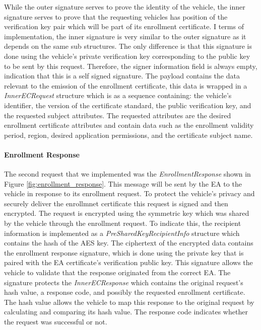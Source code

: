 While the outer signature serves to prove the identity of the vehicle, the inner signature serves to prove that the requesting vehicles has position of the verification key pair which will be part of its enrollment certificate. I terms of implementation, the inner signature is very similar to the outer signature as it depends on the same sub structures. The only difference is that this signature is done using the vehicle's private verification key corresponding to the public key to be sent by this request. Therefore, the signer information field is always empty, indication that this is a self signed signature. The payload contains the data relevant to the emission of the enrollment certificate, this data is wrapped in a \textit{InnerECRequest} structure which is as a sequence containing: the vehicle's identifier, the version of the certificate standard, the public verification key, and the requested subject attributes. The requested attributes are the desired enrollment certificate attributes and contain data such as the enrollment validity period, region, desired application permissions, and the certificate subject name. 

\paragraph{Enrollment Response}
The second request that we implemented was the \textit{EnrollmentResponse} shown in Figure \ref{fig:enrollment_response}. This message will be sent by the EA to the vehicle in response to its enrollment request. To protect the vehicle's privacy and securely deliver the enrollmnet certificate this request is signed and then encrypted. The request is encrypted using the symmetric key which was shared by the vehicle through the enrollment request. To indicate this, the recipient information is implemented as a \textit{PreSharedKeyRecipientInfo} structure which contains the hash of the AES key. The ciphertext of the encrypted data contains the enrollment response signature, which is done using the private key that is paired with the EA certificate's verification public key. This signature allows the vehicle to validate that the response originated from the correct EA. The signature protects the \textit{InnerECResponse} which contains the original request's hash value, a response code, and possibly the requested enrollment certificate. The hash value allows the vehicle to map this response to the original request by calculating and comparing its hash value. The response code indicates whether the request was successful or not. 

